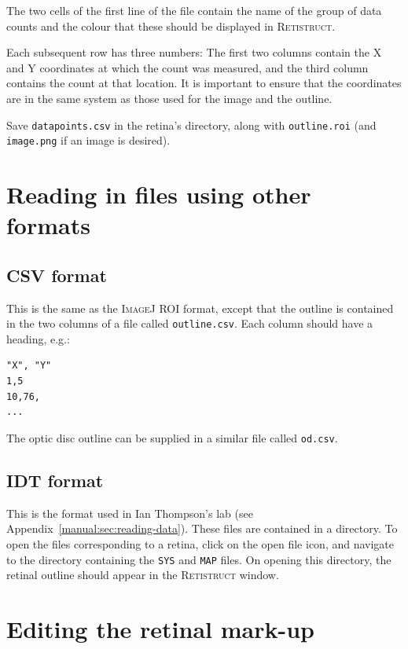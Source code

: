\documentclass{book}
\begin{document}
The two cells of the first line of the file contain the name of the
group of data counts and the colour that these should be displayed in
\textsc{Retistruct}. 

Each subsequent row has three numbers: The first two columns contain
the X and Y coordinates at which the count was measured, and the third
column contains the count at that location. It is important to ensure
that the coordinates are in the same system as those used for the
image and the outline.

Save \texttt{datapoints.csv} in the retina's directory, along with
\texttt{outline.roi} (and \texttt{image.png} if an image is desired).

\section{Reading in files using other formats}
\label{retistruct-user-guide:sec:reading-files-using}

\subsection{CSV format}
\label{retistruct-manual:sec:csv-format}

This is the same as the \textsc{ImageJ ROI} format, except that the
outline is contained in the two columns of a file called
\texttt{outline.csv}.  Each column should have a heading, e.g.:
\begin{verbatim}
"X", "Y"
1,5
10,76,
...
\end{verbatim}
The optic disc outline can be supplied in a similar file called
\texttt{od.csv}.

\subsection{IDT format}
\label{retistruct-manual:sec:idt-format}

This is the format used in Ian Thompson's lab (see
Appendix~\ref{manual:sec:reading-data}). These files are contained in
a directory. To open the files corresponding to a retina, click on the
open file icon, and navigate to the directory containing the
\texttt{SYS} and \texttt{MAP} files. On opening this directory, the
retinal outline should appear in the \textsc{Retistruct} window.

\section{Editing the retinal mark-up}
\label{manual:sec:marking-up-retina}
\end{document}
